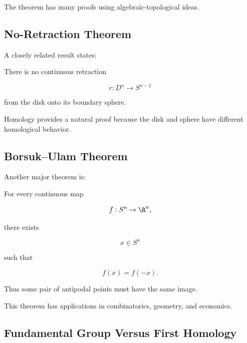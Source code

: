 The theorem has many proofs using algebraic-topological ideas.

\subsection{No-Retraction Theorem}
\label{subsec:no-retraction-theorem}

A closely related result states:

\begin{theorem}
There is no continuous retraction

\[
\boxed{
r:D^n\to S^{n-1}
}
\]

from the disk onto its boundary sphere.
\end{theorem}

Homology provides a natural proof because the disk and sphere have different
homological behavior.

\subsection{Borsuk--Ulam Theorem}
\label{subsec:borsuk-ulam}

Another major theorem is:

\begin{theorem}
For every continuous map

\[
f:S^n\to\R^n,
\]

there exists

\[
x\in S^n
\]

such that

\[
\boxed{
f(x)=f(-x).
}
\]
\end{theorem}

Thus some pair of antipodal points must have the same image.

This theorem has applications in combinatorics, geometry, and economics.

\subsection{Fundamental Group Versus First Homology}
\label{subsec:pi1-vs-h1}

